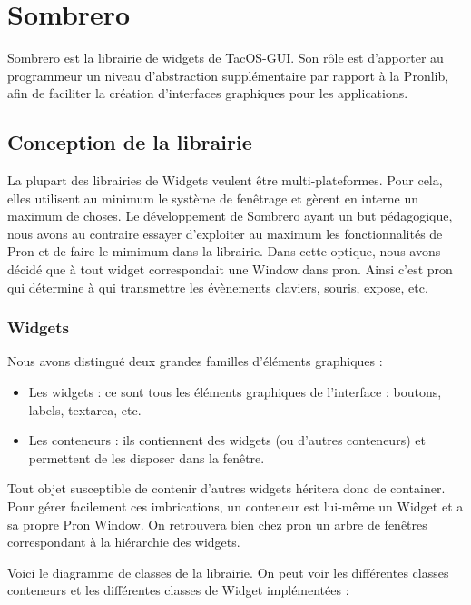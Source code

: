 \section{Sombrero}

Sombrero est la librairie de widgets de TacOS-GUI.
Son rôle est d'apporter au programmeur un niveau d'abstraction supplémentaire par rapport à la Pronlib, afin de faciliter la création d'interfaces graphiques pour les applications.

\subsection{Conception de la librairie}

La plupart des librairies de Widgets veulent être multi-plateformes.
Pour cela, elles utilisent au minimum le système de fenêtrage et gèrent en interne un maximum de choses.
Le développement de Sombrero ayant un but pédagogique, nous avons au contraire essayer d'exploiter au maximum les fonctionnalités de Pron et de faire le mimimum dans la librairie.
Dans cette optique, nous avons décidé que à tout widget correspondait une Window dans pron.
Ainsi c'est pron qui détermine à qui transmettre les évènements claviers, souris, expose, etc.

\subsubsection{Widgets}

Nous avons distingué deux grandes familles d'éléments graphiques :

\begin{itemize}
  \item Les widgets : ce sont tous les éléments graphiques de l'interface : boutons, labels, textarea, etc.
  \item Les conteneurs : ils contiennent des widgets (ou d'autres conteneurs) et permettent de les disposer dans la fenêtre.
\end{itemize}

Tout objet susceptible de contenir d'autres widgets héritera donc de container.
Pour gérer facilement ces imbrications, un conteneur est lui-même un Widget et a sa propre Pron Window.
On retrouvera bien chez pron un arbre de fenêtres correspondant à la hiérarchie des widgets.

Voici le diagramme de classes de la librairie. On peut voir les différentes classes conteneurs et les différentes classes de Widget implémentées :

